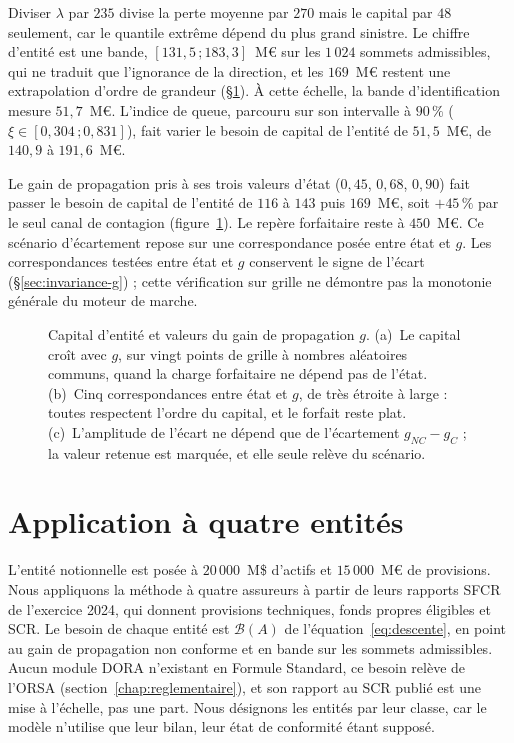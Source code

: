 Diviser $\lambda$ par $235$ divise la perte moyenne par $270$ mais le capital par $48$ seulement, car
le quantile extrême dépend du plus grand sinistre. Le chiffre d'entité est une bande,
$[131{,}5\,;183{,}3]$~M\euro{} sur les $1\,024$ sommets admissibles, qui ne traduit que l'ignorance de
la direction, et les $169$~M\euro{} restent une extrapolation d'ordre de grandeur
(\S\ref{sec:entites-reelles}). À cette échelle, la bande
d'identification mesure $51{,}7$~M\euro. L'indice de queue, parcouru sur son intervalle à $90\,\%$
($\xi \in [0{,}304\,;0{,}831]$), fait varier le
besoin de capital de l'entité de $51{,}5$~M\euro, de $140{,}9$ à $191{,}6$~M\euro.

Le gain de propagation pris à ses trois valeurs d'état ($0{,}45$, $0{,}68$, $0{,}90$) fait passer le
besoin de capital de l'entité de $116$ à $143$ puis $169$~M\euro, soit $+45\,\%$ par le seul canal de contagion
(figure~\ref{fig:invariance-g-rapport}). Le repère forfaitaire reste à $450$~M\euro. Ce scénario d'écartement repose sur une correspondance
posée entre état et $g$. Les correspondances testées entre état et $g$ conservent le signe de l'écart (\S\ref{sec:invariance-g}) ; cette vérification sur grille ne démontre pas la monotonie générale du moteur de marche.

\begin{figure}[H]\centering
{}
\caption{Capital d'entité et valeurs du gain de propagation $g$. (a)~Le capital croît avec $g$, sur
vingt points de grille à nombres aléatoires communs, quand la charge forfaitaire ne dépend pas de
l'état. (b)~Cinq correspondances entre état et $g$, de très étroite à large : toutes respectent
l'ordre du capital, et le forfait reste plat. (c)~L'amplitude de l'écart ne dépend que de
l'écartement $g_{NC}-g_C$ ; la valeur retenue est marquée, et elle seule relève du scénario.}
\label{fig:invariance-g-rapport}
\end{figure}

\section{Application à quatre entités}
\label{sec:entites-reelles}

L'entité notionnelle est posée à $20\,000$~M\$ d'actifs et $15\,000$~M\euro{} de provisions. Nous
appliquons la méthode à quatre assureurs à partir de leurs rapports SFCR de l'exercice 2024, qui
donnent provisions techniques, fonds propres éligibles et SCR. Le besoin de chaque entité est
$\mathcal{B}(A)$ de l'équation~\eqref{eq:descente}, en point au gain de propagation non conforme et
en bande sur les sommets admissibles. Aucun module DORA n'existant en Formule Standard, ce besoin
relève de l'ORSA (section~\ref{chap:reglementaire}), et son rapport au SCR publié est une mise à
l'échelle, pas une part. Nous désignons les entités par leur classe, car le modèle n'utilise que leur
bilan, leur état de conformité étant supposé.

